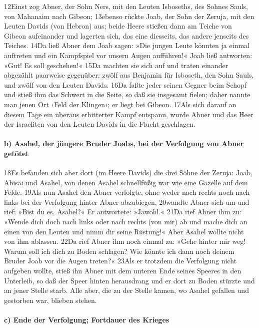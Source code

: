 12Einst zog Abner, der Sohn Ners, mit den Leuten Isboseths, des Sohnes
Sauls, von Mahanaim nach Gibeon; 13ebenso rückte Joab, der Sohn der
Zeruja, mit den Leuten Davids (von Hebron) aus; beide Heere stießen dann
am Teiche von Gibeon aufeinander und lagerten sich, das eine diesseits,
das andere jenseits des Teiches. 14Da ließ Abner dem Joab sagen: »Die
jungen Leute könnten ja einmal auftreten und ein Kampfspiel vor unsern
Augen aufführen!« Joab ließ antworten: »Gut! Es soll geschehen!« 15Da
machten sie sich auf und traten einander abgezählt paarweise gegenüber:
zwölf aus Benjamin für Isboseth, den Sohn Sauls, und zwölf von den
Leuten Davids. 16Da faßte jeder seinen Gegner beim Schopf und stieß ihm
das Schwert in die Seite, so daß sie insgesamt fielen; daher nannte man
jenen Ort ›Feld der Klingen‹; er liegt bei Gibeon. 17Als sich darauf an
diesem Tage ein überaus erbitterter Kampf entspann, wurde Abner und das
Heer der Israeliten von den Leuten Davids in die Flucht geschlagen.

\hypertarget{b-asahel-der-juxfcngere-bruder-joabs-bei-der-verfolgung-von-abner-getuxf6tet}{%
\paragraph{b) Asahel, der jüngere Bruder Joabs, bei der Verfolgung von
Abner
getötet}\label{b-asahel-der-juxfcngere-bruder-joabs-bei-der-verfolgung-von-abner-getuxf6tet}}

18Es befanden sich aber dort (im Heere Davids) die drei Söhne der
Zeruja: Joab, Abisai und Asahel, von denen Asahel schnellfüßig war wie
eine Gazelle auf dem Felde. 19Als nun Asahel den Abner verfolgte, ohne
weder nach rechts noch nach links bei der Verfolgung hinter Abner
abzubiegen, 20wandte Abner sich um und rief: »Bist du es, Asahel?« Er
antwortete: »Jawohl.« 21Da rief Abner ihm zu: »Wende dich doch nach
links oder nach rechts (von mir) ab und mache dich an einen von den
Leuten und nimm dir seine Rüstung!« Aber Asahel wollte nicht von ihm
ablassen. 22Da rief Abner ihm noch einmal zu: »Gehe hinter mir weg!
Warum soll ich dich zu Boden schlagen? Wie könnte ich dann noch deinem
Bruder Joab vor die Augen treten?« 23Als er trotzdem die Verfolgung
nicht aufgeben wollte, stieß ihn Abner mit dem unteren Ende seines
Speeres in den Unterleib, so daß der Speer hinten herausdrang und er
dort zu Boden stürzte und an jener Stelle starb. Alle aber, die zu der
Stelle kamen, wo Asahel gefallen und gestorben war, blieben stehen.

\hypertarget{c-ende-der-verfolgung-fortdauer-des-krieges}{%
\paragraph{c) Ende der Verfolgung; Fortdauer des
Krieges}\label{c-ende-der-verfolgung-fortdauer-des-krieges}}

